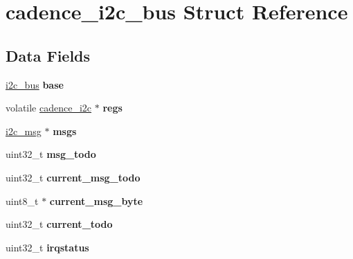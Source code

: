 \hypertarget{structcadence__i2c__bus}{}\section{cadence\+\_\+i2c\+\_\+bus Struct Reference}
\label{structcadence__i2c__bus}
\subsection*{Data Fields}
\begin{DoxyCompactItemize}
\item 
\mbox{\label{structcadence__i2c__bus_a10cb88935e77d9f170871412b903e3cc}} 
\mbox{\hyperlink{structi2c__bus}{i2c\+\_\+bus}} {\bfseries base}
\item 
\mbox{\label{structcadence__i2c__bus_ab417c78461e10e519dbc7a3b33c146b7}} 
volatile \mbox{\hyperlink{structcadence__i2c}{cadence\+\_\+i2c}} $\ast$ {\bfseries regs}
\item 
\mbox{\label{structcadence__i2c__bus_a17ba22145f81ff215b04de2337f839b8}} 
\mbox{\hyperlink{structi2c__msg}{i2c\+\_\+msg}} $\ast$ {\bfseries msgs}
\item 
\mbox{\label{structcadence__i2c__bus_a168c63b73b53b83d88152cba755f26d0}} 
uint32\+\_\+t {\bfseries msg\+\_\+todo}
\item 
\mbox{\label{structcadence__i2c__bus_a6832504c86eae3cde2f7fc308864b543}} 
uint32\+\_\+t {\bfseries current\+\_\+msg\+\_\+todo}
\item 
\mbox{\label{structcadence__i2c__bus_ab7a1ad89f6f41461a17a2cdcf38c6e06}} 
uint8\+\_\+t $\ast$ {\bfseries current\+\_\+msg\+\_\+byte}
\item 
\mbox{\label{structcadence__i2c__bus_aee149300b3b326272656f44826e6fc35}} 
uint32\+\_\+t {\bfseries current\+\_\+todo}
\item 
\mbox{\label{structcadence__i2c__bus_a81fc7acab16d7cc3915f566f04ed5ec5}} 
uint32\+\_\+t {\bfseries irqstatus}
\item 

\end{DoxyCompactItemize}
